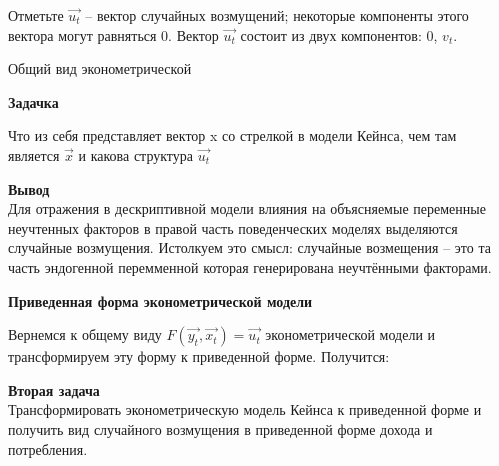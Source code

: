 \documentclass[12pt,a4paper]{article}
\begin{document}
Отметьте $\vec{u_t}$ -- вектор случайных возмущений; некоторые компоненты этого вектора могут равняться 0. Вектор $\vec{u_t}$ состоит из двух компонентов: 0, $v_t$.

Общий вид эконометрической

\textbf{Задачка}

Что из себя представляет вектор x со стрелкой в модели Кейнса, чем там является $\vec{x}$ и какова структура $\vec{u_t}$

\textbf{Вывод} \\
Для отражения в дескриптивной модели влияния на объясняемые переменные неучтенных факторов в правой часть поведенческих моделях выделяются случайные возмущения.
Истолкуем это смысл: случайные возмещения -- это та часть эндогенной перемменной которая генерирована неучтёнными факторами.

\begin{center}
\textbf{Приведенная форма эконометрической модели}
\end{center}

Вернемся к общему виду $F(\vec{y_t}, \vec{x_t}) = \vec{u_t}$ эконометрической модели и трансформируем эту форму к приведенной форме. Получится:



\textbf{Вторая задача}\\
Трансформировать эконометрическую модель Кейнса к приведенной форме и получить вид случайного возмущения в приведенной форме дохода и потребления.
\end{document}
